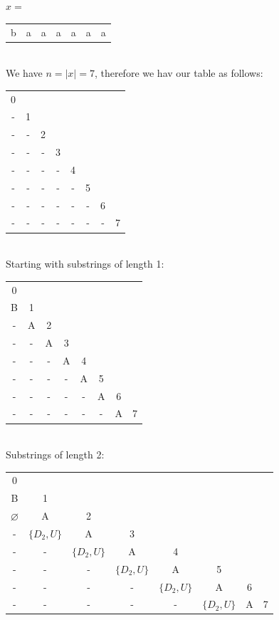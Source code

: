 \documentclass[letterpaper]{article}
\theoremstyle{plain}
\theoremstyle{definition}
\theoremstyle{remark}
\begin{document}
\section*{\thesubsection}

$x = $ \begin{tabular}{|l|l|l|l|l|l|l|}
    b&a&a&a&a&a&a
\end{tabular}\\[1em]
We have $n=|x|=7$, therefore we hav our table as follows:\\[1em]
\begin{tabular}{@{}c c c c c c c c@{}}
0 &   &   &   &   &   &   &   \\
- & 1 &   &   &   &   &   &   \\
- & - & 2 &   &   &   &   &   \\
- & - & - & 3 &   &   &   &   \\
- & - & - & - & 4 &   &   &   \\
- & - & - & - & - & 5 &   &   \\
- & - & - & - & - & - & 6 &   \\
- & - & - & - & - & - & - & 7 \\
\end{tabular}\\[1em]
Starting with substrings of length 1:\\[1em]
\begin{tabular}{@{}c c c c c c c c@{}}
0 &   &   &   &   &   &   &   \\
B & 1 &   &   &   &   &   &   \\
- & A & 2 &   &   &   &   &   \\
- & - & A & 3 &   &   &   &   \\
- & - & - & A & 4 &   &   &   \\
- & - & - & - & A & 5 &   &   \\
- & - & - & - & - & A & 6 &   \\
- & - & - & - & - & - & A & 7 \\
\end{tabular}\\[5em]
Substrings of length 2:\\[1em]
\begin{tabular}{@{}c c c c c c c c@{}}
0 &   &   &   &   &   &   &   \\
B & 1 &   &   &   &   &   &   \\
$\varnothing$ & A & 2 &   &   &   &   &   \\
- & $\{D_2,U\}$& A & 3 &   &   &   &   \\
- & - & $\{D_2,U\}$ & A & 4 &   &   &   \\
- & - & - & $\{D_2,U\}$ & A & 5 &   &   \\
- & - & - & - & $\{D_2,U\}$ & A & 6 &   \\
- & - & - & - & - & $\{D_2,U\}$ & A & 7 \\
\end{tabular}\\[1em]
\end{document}

